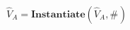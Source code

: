 \documentclass[border=2pt]{standalone}
\begin{document}
${{\hat{V}}}{_{A}}=\textbf{Instantiate}({{\hat{V}}}{_{A}}, {{\#}}{_{}})$
\end{document}
